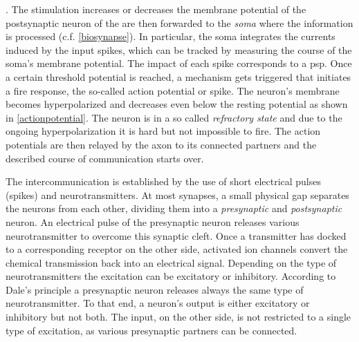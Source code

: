 . The stimulation increases or decreases the membrane potential of the postsynaptic neuron of the  are then forwarded to the \emph{soma} where the information is processed (c.f. \cref{biosynapse}). 
In particular, the soma integrates the currents induced by the input spikes, which can be tracked by measuring the course of the soma's membrane potential.
 The impact of each spike corresponds to a \gls{psp}. Once a certain threshold potential is reached, a mechanism gets triggered that initiates a fire response, the so-called action potential or spike. The neuron's membrane becomes hyperpolarized and decreases even below the resting potential as shown in \cref{actionpotential}. The neuron is in a so called \emph{refractory state} and due to the ongoing hyperpolarization it is hard but not impossible to fire. The action potentials are then relayed by the axon to its connected partners and the described course of communication starts over. 


The intercommunication is established by the use of short electrical pulses (spikes) and neurotransmitters. At most synapses, a small physical gap separates the neurons from each other, dividing them into a \emph{presynaptic} and \emph{postsynaptic} neuron. An electrical pulse of the presynaptic neuron releases various neurotransmitter to overcome this synaptic cleft. Once a transmitter has docked to a corresponding receptor on the other side, activated ion channels convert the chemical transmission back into an electrical signal. Depending on the type of neuro\-transmitters the excitation  can be excitatory or inhibitory. According to Dale's principle a presynaptic neuron releases always the same type of neurotransmitter. To that end, a neuron's output is either excitatory or inhibitory but not both. The input, on the other side, is not restricted to a single type of excitation, as various presynaptic partners can be connected.


